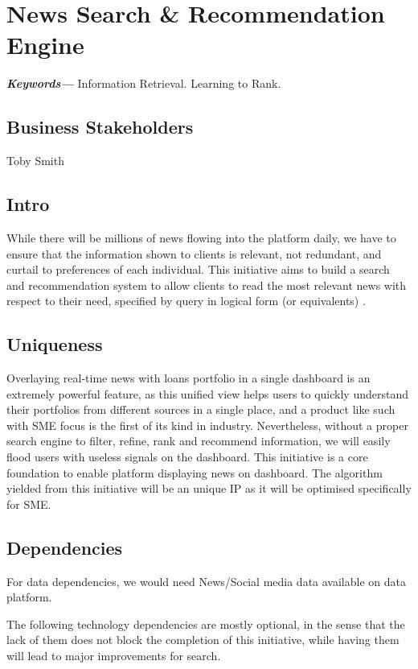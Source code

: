\documentclass[]{article}
\providecommand{\keywords}[1]{\textbf{\textit{Keywords---}} #1}
\begin{document}
\newpage


\section{News Search \& Recommendation Engine}
\keywords{Information Retrieval. Learning to Rank.}
\subsection{Business Stakeholders}
Toby Smith
\subsection{Intro}
While there will be millions of news flowing into the platform daily, we have 
to ensure that the information shown to clients is relevant, not 
redundant, and curtail to preferences of each individual. This 
initiative aims to build 
a search and recommendation system to allow clients to read the most relevant 
news with respect to their need, specified by query in logical form (or 
equivalents) \cite{may1985logical}.

\subsection{Uniqueness}
Overlaying real-time news with loans portfolio in a single dashboard is an 
extremely powerful feature, as this unified view helps users to quickly 
understand their portfolios from different sources in a single place, and 
a product like such with SME focus is the first of its kind in industry. 
Nevertheless, without a proper search engine to filter, refine, rank 
and recommend information, we will easily flood users with useless signals 
on the dashboard. This initiative is a core foundation to enable platform 
displaying news on dashboard. The algorithm yielded from this initiative will 
be an unique IP as it will be optimised specifically for SME.


\subsection{Dependencies}
For data dependencies, we would need News/Social media data available on data 
platform.

The following technology dependencies are mostly optional, in the sense that 
the lack of them does not block the completion of this initiative, while having 
them will lead to major improvements for search.
\end{document}
